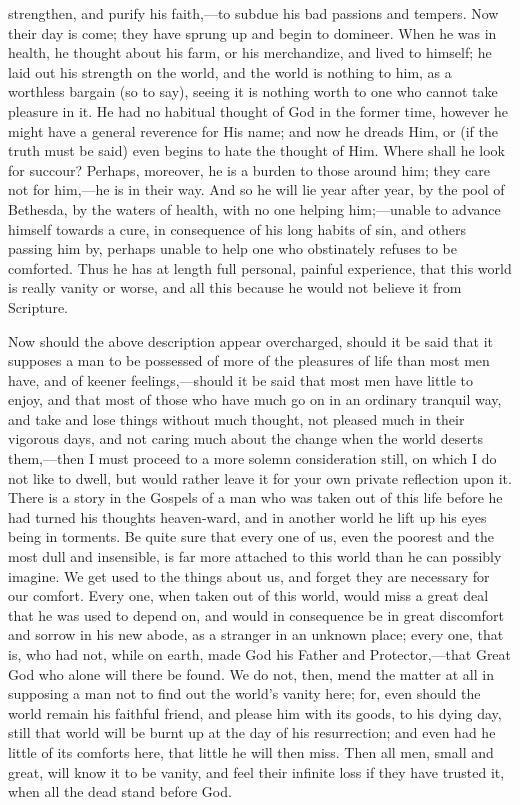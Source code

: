 strengthen, and purify his faith,—to subdue his bad
passions and tempers. Now their day is come; they have
sprung up and begin to domineer. When he was in health,
he thought about his farm, or his merchandize, and lived
to himself; he laid out his strength on the world, and
the world is nothing to him, as a worthless bargain (so
to say), seeing it is nothing worth to one who cannot
take pleasure in it. He had no habitual thought of God in
the former time, however he might have a general
reverence for His name; and now he dreads Him, or (if the
truth must be said) even begins to hate the thought of
Him. Where shall he look for succour? Perhaps, moreover,
he is a burden to those around him; they care not for
him,—he is in their way. And so he will lie year
after year, by the pool of Bethesda, by the waters of
health, with no one helping him;—unable to advance
himself towards a cure, in consequence of his long habits
of sin, and others passing him by, perhaps unable to help
one who obstinately refuses to be comforted. Thus he has
at length full personal, painful experience, that this
world is really vanity or worse, and all this because he
would not believe it from Scripture.

Now should the above description appear overcharged,
should it be said that it supposes a man to be possessed
of more of the pleasures of life than most men have, and
of keener feelings,—should it be said that most men
have little to enjoy, and that most of those who have
much go on in an ordinary tranquil way, and take and lose
things without much thought, not pleased much in their
vigorous days, and not caring much about the change when
the world deserts them,—then I must proceed to a
more solemn consideration still, on which I do not like
to dwell, but would rather leave it for your own private
reflection upon it. There is a story in the Gospels of a
man who was taken out of this life before he had turned
his thoughts heaven-ward, and in another world he lift up
his eyes being in torments. Be quite sure that every one
of us, even the poorest and the most dull and insensible,
is far more attached to this world than he can possibly
imagine. We get used to the things about us, and forget
they are necessary for our comfort. Every one, when taken
out of this world, would miss a great deal that he was
used to depend on, and would in consequence be in great
discomfort and sorrow in his new abode, as a stranger in
an unknown place; every one, that is, who had not, while
on earth, made God his Father and Protector,—that
Great God who alone will there be found. We do not, then,
mend the matter at all in supposing a man not to find out
the world's vanity here; for, even should the world
remain his faithful friend, and please him with its
goods, to his dying day, still that world will be burnt
up at the day of his resurrection; and even had he little
of its comforts here, that little he will then miss. Then
all men, small and great, will know it to be vanity, and
feel their infinite loss if they have trusted it, when
all the dead stand before God.

